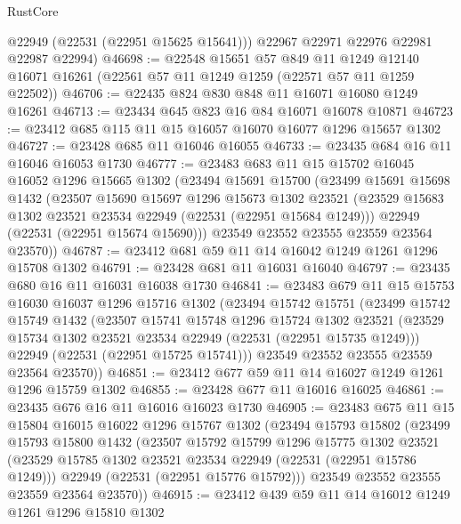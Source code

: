 \begin{lexlean}{RustCore}
\begin{coremodule}
        @22949
        (@22531 (@22951 @15625 @15641)))
      @22967
      @22971
      @22976
      @22981
      @22987
      @22994)
@46698 := @22548
    @15651
    @57
    @849
    @11
    @1249
    @12140
    @16071
    @16261
    (@22561 @57 @11 @1249 @1259 (@22571 @57 @11 @1259 @22502))
@46706 := @22435 @824 @830 @848 @11 @16071 @16080 @1249 @16261
@46713 := @23434 @645 @823 @16 @84 @16071 @16078 @10871
@46723 := @23412 @685 @115 @11 @15 @16057 @16070 @16077 @1296 @15657 @1302
@46727 := @23428 @685 @11 @16046 @16055
@46733 := @23435 @684 @16 @11 @16046 @16053 @1730
@46777 := @23483
    @683
    @11
    @15
    @15702
    @16045
    @16052
    @1296
    @15665
    @1302
    (@23494
      @15691
      @15700
      (@23499
        @15691
        @15698
        @1432
        (@23507
          @15690
          @15697
          @1296
          @15673
          @1302
          @23521
          (@23529 @15683 @1302 @23521 @23534 @22949 (@22531 (@22951 @15684 @1249)))
          @22949
          (@22531 (@22951 @15674 @15690)))
        @23549
        @23552
        @23555
        @23559
        @23564
        @23570))
@46787 := @23412 @681 @59 @11 @14 @16042 @1249 @1261 @1296 @15708 @1302
@46791 := @23428 @681 @11 @16031 @16040
@46797 := @23435 @680 @16 @11 @16031 @16038 @1730
@46841 := @23483
    @679
    @11
    @15
    @15753
    @16030
    @16037
    @1296
    @15716
    @1302
    (@23494
      @15742
      @15751
      (@23499
        @15742
        @15749
        @1432
        (@23507
          @15741
          @15748
          @1296
          @15724
          @1302
          @23521
          (@23529 @15734 @1302 @23521 @23534 @22949 (@22531 (@22951 @15735 @1249)))
          @22949
          (@22531 (@22951 @15725 @15741)))
        @23549
        @23552
        @23555
        @23559
        @23564
        @23570))
@46851 := @23412 @677 @59 @11 @14 @16027 @1249 @1261 @1296 @15759 @1302
@46855 := @23428 @677 @11 @16016 @16025
@46861 := @23435 @676 @16 @11 @16016 @16023 @1730
@46905 := @23483
    @675
    @11
    @15
    @15804
    @16015
    @16022
    @1296
    @15767
    @1302
    (@23494
      @15793
      @15802
      (@23499
        @15793
        @15800
        @1432
        (@23507
          @15792
          @15799
          @1296
          @15775
          @1302
          @23521
          (@23529 @15785 @1302 @23521 @23534 @22949 (@22531 (@22951 @15786 @1249)))
          @22949
          (@22531 (@22951 @15776 @15792)))
        @23549
        @23552
        @23555
        @23559
        @23564
        @23570))
@46915 := @23412 @439 @59 @11 @14 @16012 @1249 @1261 @1296 @15810 @1302

\end{coremodule}
\end{lexlean}
